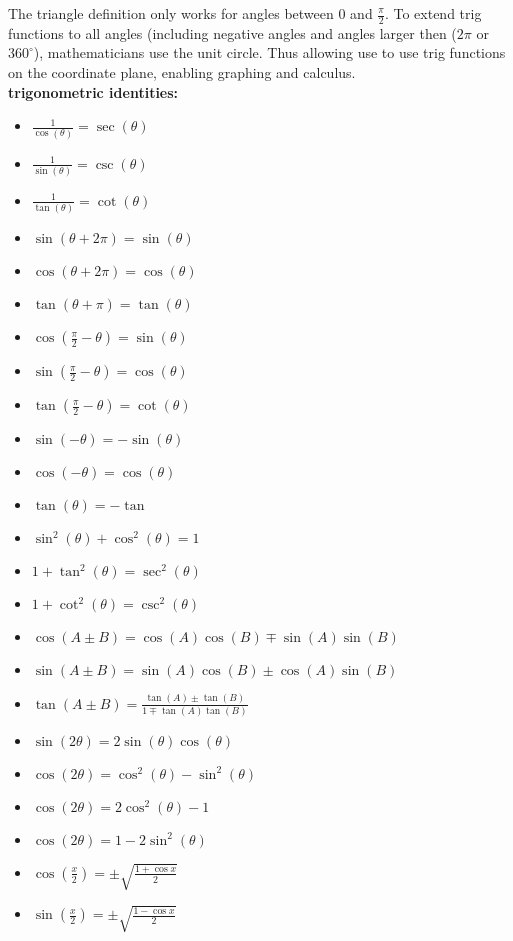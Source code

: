 \documentclass{article}
\begin{document}
The triangle definition only works for angles between 0 and $\frac{\pi}{2}$. To extend trig functions to all angles (including negative angles and angles larger then ($2\pi$ or $360^{\circ}$), mathematicians use the unit circle. Thus allowing use to use trig functions on the coordinate plane, enabling graphing and calculus.\\	

\textbf{trigonometric identities:}
\begin{itemize}
	\item $\frac{1}{\cos(\theta)} = \sec(\theta)$	
	\item $\frac{1}{\sin(\theta)} = \csc(\theta) $
	\item $\frac{1}{\tan(\theta)} = \cot(\theta)$
	\item $\sin(\theta + 2\pi) = \sin(\theta)$
	\item $\cos(\theta + 2\pi) = \cos(\theta)$
	\item $\tan(\theta + \pi) = \tan(\theta)$
	\item $\cos(\frac{\pi}{2} - \theta) = \sin(\theta)$
	\item $\sin(\frac{\pi}{2} - \theta) = \cos(\theta)$
	\item $\tan(\frac{\pi}{2} - \theta) = \cot(\theta)$
	\item $\sin(-\theta) = -\sin(\theta)$
	\item $\cos(-\theta) = \cos(\theta)$
	\item $\tan(\theta) = -\tan$
	\item $\sin^2(\theta) + \cos^2(\theta) = 1$
	\item $1 + \tan^2(\theta) = \sec^2(\theta)$
	\item $1 + \cot^2(\theta) = \csc^2(\theta)$
	\item $\cos(A \pm B) = \cos(A)\cos(B) \mp \sin(A)\sin(B)$		
	\item $\sin(A \pm B) = \sin(A)\cos(B) \pm \cos(A)\sin(B)$
	\item $\tan(A \pm B) = \frac{\tan(A) \pm \tan(B)}{1 \mp \tan(A)\tan(B)}$
	\item $\sin(2\theta) = 2\sin(\theta)\cos(\theta)$
	\item $\cos(2\theta) = \cos^2(\theta) - \sin^2(\theta)$		
	\item $\cos(2\theta) = 2\cos^2(\theta) - 1$
	\item $\cos(2\theta) = 1 - 2\sin^2(\theta)$
	\item $\cos\left(\frac{x}{2}\right) = \pm \sqrt{\frac{1 + \cos x}{2}}$
	\item $\sin\left(\frac{x}{2}\right) = \pm \sqrt{\frac{1 - \cos x}{2}}$

\end{itemize}
\end{document}

